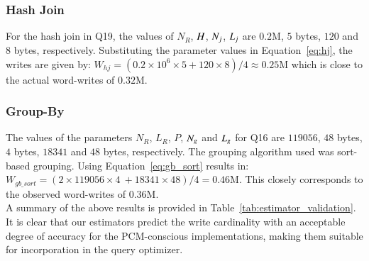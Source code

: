 \subsubsection{Hash Join}
For the hash join in Q19, the values of $N_R$, $H$, $N_j$,
$L_j$ are $0.2$M, $5$ bytes, $120$ and $8$ bytes, respectively. 
Substituting the parameter values in Equation~\ref{eq:hj}, the writes are given by:  
$W_{hj} = (0.2 \times 10^6 \times 5  + 120 \times 8)/4  \approx 0.25$M 
\noindent
which is close to the actual word-writes of $0.32$M.

  
\subsubsection{Group-By}
The values of the parameters $N_R$, $L_R$, $P$, $N_g$ and $L_g$ for Q16
are $119056$, $48$ bytes, $4$ bytes, $18341$ and $48$ bytes, respectively.  
The grouping algorithm used was sort-based grouping. Using Equation~\ref{eq:gb_sort} results in:
$W_{gb\_sort} = (2 \times 119056 \times 4 \  + 18341 \times 48)/4 = 0.46$M. 
\noindent
This closely corresponds to the observed word-writes of $0.36$M.
\\

A summary of the above results is provided in
Table~\ref{tab:estimator_validation}. It is clear that our estimators
predict the write cardinality with an acceptable degree of accuracy for
the PCM-conscious implementations, making them suitable for incorporation
in the query optimizer.

